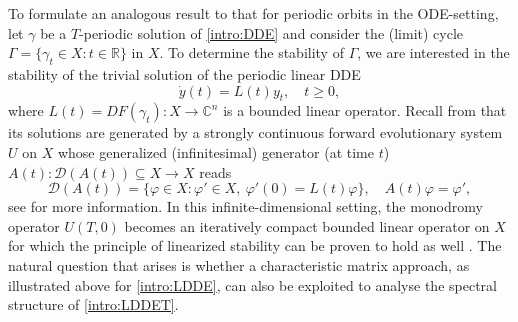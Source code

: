 \documentclass[english]{myarticle}
\begin{document}
\begin{sloppypar}
To formulate an analogous result to that for periodic orbits in the ODE-setting, let $\gamma$ be a $T$-periodic solution of \eqref{intro:DDE} and consider the (limit) cycle $\Gamma = \{\gamma_t \in X : t \in \mathbb{R} \}$ in $X$. To determine the stability of $\Gamma$, we are interested in the stability of the trivial solution of the periodic linear DDE
\begin{equation} \tag{LDDE$_T$} \label{intro:LDDET}
    \dot{y}(t) = L(t)y_t, \quad t \geq 0,
\end{equation}
where $L(t) = DF(\gamma_t) : X \to \mathbb{C}^n$ is a bounded linear operator. Recall from \cite{Diekmann1995,Hale1993} that its solutions are generated by a strongly continuous forward evolutionary system $U$ on $X$ whose generalized (infinitesimal) generator (at time $t$) $A(t) : \mathcal{D}(A(t)) \subseteq X \to X$ reads
\begin{equation*}
    \mathcal{D}(A(t)) = \{\varphi \in X : \varphi' \in X, \ \varphi'(0) = L(t)\varphi\}, \quad A(t)\varphi = \varphi',
\end{equation*}
see \cite{Article2,Article1,Clement1988} for more information. In this infinite-dimensional setting, the monodromy operator $U(T,0)$ becomes an iteratively compact bounded linear operator on $X$ for which the principle of linearized stability can be proven to hold as well \cite{Diekmann1995}. The natural question that arises is whether a characteristic matrix approach, as illustrated above for \eqref{intro:LDDE}, can also be exploited to analyse the spectral structure of \eqref{intro:LDDET}. 


\end{sloppypar}
\end{document}
